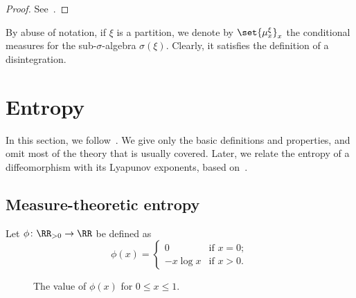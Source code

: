 \documentclass[../main]{subfiles}
\begin{document}
\begin{proof}
  See~\cite[theorem 5.14]{einsiedlerErgodicTheoryView2011}.
\end{proof}

\begin{remark}
  By abuse of notation, if \(\xi\) is a partition, we denote by \(\set{\mu^{\xi}_x}_x\) the conditional measures for the sub-\(\sigma\)-algebra \(\sigma(\xi)\). Clearly, it satisfies the definition of a disintegration.
\end{remark}

\section{Entropy}\label{sec:entropy}

In this section, we follow~\cite{einsiedlerEntropyErgodicTheory}. We give only the basic definitions and properties, and omit most of the theory that is usually covered. Later, we relate the entropy of a diffeomorphism with its Lyapunov exponents, based on~\cite{ledrappierMetricEntropyDiffeomorphisms1985a}.

\subsection{Measure-theoretic entropy}

\begin{definition}
  Let \(\phi \colon \RR_{>0} \to \RR\) be defined as
  \begin{equation*}
    \phi(x) =
    \begin{cases}
      0 & \text{if }x = 0;\\[-4pt]
      - x \log x & \text{if } x > 0.
    \end{cases}
  \end{equation*}
\end{definition}
\begin{figure}[h]
  \centering
  \caption{The value of \(\phi(x)\) for \(0 \le x \le 1\).}
\end{figure}
\end{document}
